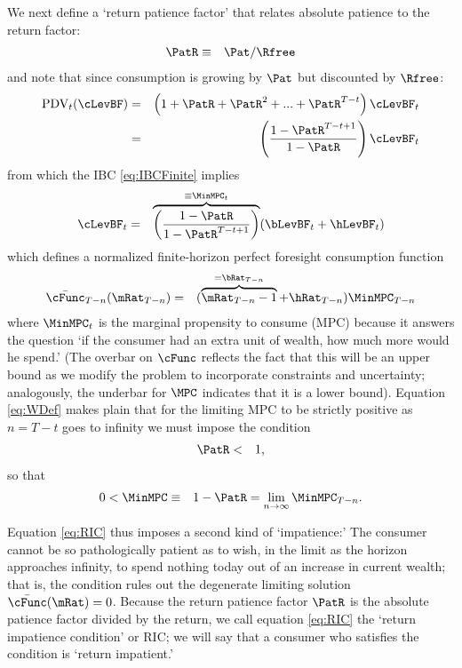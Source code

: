 \documentclass[titlepage]{\econtex}\providecommand{\texname}{BufferStockTheory}
\begin{document}
We next define a `return patience factor' that relates absolute patience to the return factor:
\begin{eqnarray}
 \PatR & \equiv & {\Pat}/\Rfree \label{eq:PatR}
\end{eqnarray}
and note that since consumption is growing by $\Pat$ but discounted by $\Rfree$:
\begin{eqnarray*}
  \text{PDV}_{t}(\cLevBF) & = & \left(1+\PatR+\PatR^{2}+...+ \PatR^{T-t}\right)\cLevBF_{t} \notag
\\ & = & \left(\frac{1-\PatR^{T-t+1}}{1-\PatR}\right)\cLevBF_{t}
\end{eqnarray*}
from which the IBC \eqref{eq:IBCFinite} implies
\begin{eqnarray}
  \cLevBF_{t} & = & \overbrace{\left(\frac{1-\PatR}{1-\PatR^{T-t+1}}\right)}^{\equiv \MinMPC_{t}}
(\bLevBF_{t}+\hLevBF_{t}) \label{eq:vecMuDef} \label{eq:WDef}
\end{eqnarray}
which defines a normalized finite-horizon perfect foresight consumption function
\begin{eqnarray}
  \bar{\cFunc}_{T-n}(\mRat_{T-n}) & = & (\overbrace{\mRat_{T-n}-1}^{=\bRat_{T-n}}+\hRat_{T-n})\MinMPC_{T-n}
\end{eqnarray}
where $\MinMPC_{t}$ is the marginal propensity to consume (MPC) because it answers the
question `if the consumer had an extra unit of wealth, how much more would he spend.'
(The overbar on $\cFunc$ reflects the fact that this will be an upper bound as we modify the problem to incorporate constraints and uncertainty; analogously, the underbar for $\MPC$ indicates that it is a lower bound).
Equation \eqref{eq:WDef} makes plain that for the limiting
MPC to be strictly positive as $n=T-t$ goes to infinity we must impose the
condition \hypertarget{RIC}{}
\begin{eqnarray}
\PatR & < & 1 \label{eq:PDVCFinite} \label{eq:RIC},
\end{eqnarray}
so that
\begin{eqnarray}
   0 <  \MinMPC & \equiv &  1-\PatR = \lim_{n \rightarrow \infty} \MinMPC_{T-n} \label{eq:MinMPCDef}
.
\end{eqnarray}

Equation \eqref{eq:RIC} thus imposes a second kind of `impatience:' The consumer cannot be so pathologically patient as to wish, in the limit as the horizon approaches infinity, to spend nothing today out of an increase in current wealth; that is, the condition rules out the degenerate limiting solution $\bar{\cFunc}(\mRat)=0$.  Because the return patience factor $\PatR$ is the absolute patience factor divided by the return, we call equation \eqref{eq:RIC} the `return impatience condition' or RIC; we will say that a consumer who satisfies the condition is `return impatient.'
\end{document}
